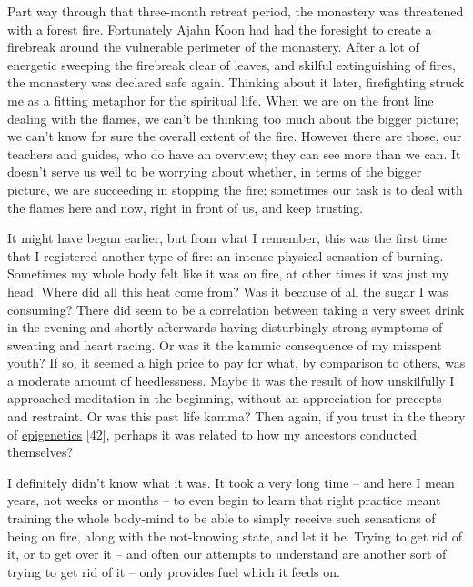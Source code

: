Part way through that three-month retreat period, the monastery was
threatened with a forest fire. Fortunately Ajahn Koon had had the
foresight to create a firebreak around the vulnerable perimeter of the
monastery. After a lot of energetic sweeping the firebreak clear of
leaves, and skilful extinguishing of fires, the monastery was declared
safe again. Thinking about it later, firefighting struck me as a fitting
metaphor for the spiritual life. When we are on the front line dealing
with the flames, we can't be thinking too much about the bigger picture;
we can't know for sure the overall extent of the fire. However there are
those, our teachers and guides, who do have an overview; they can see
more than we can. It doesn't serve us well to be worrying about whether,
in terms of the bigger picture, we are succeeding in stopping the fire;
sometimes our task is to deal with the flames here and now, right in
front of us, and keep trusting.

It might have begun earlier, but from what I remember, this was the
first time that I registered another type of fire: an intense physical
sensation of burning. Sometimes my whole body felt like it was on fire,
at other times it was just my head. Where did all this heat come from?
Was it because of all the sugar I was consuming? There did seem to be a
correlation between taking a very sweet drink in the evening and shortly
afterwards having disturbingly strong symptoms of sweating and heart
racing. Or was it the kammic consequence of my misspent youth? If so, it
seemed a high price to pay for what, by comparison to others, was a
moderate amount of heedlessness. Maybe it was the result of how
unskilfully I approached meditation in the beginning, without an
appreciation for precepts and restraint. Or was this past life kamma?
Then again, if you trust in the theory of
\href{https://en.wikipedia.org/wiki/Epigenetics}{\underline{epigenetics}}
{[}42{]}, perhaps it was related to how my ancestors conducted
themselves?

I definitely didn't know what it was. It took a very long time -- and
here I mean years, not weeks or months -- to even begin to learn that
right practice meant training the whole body-mind to be able to simply
receive such sensations of being on fire, along with the not-knowing
state, and let it be. Trying to get rid of it, or to get over it -- and
often our attempts to understand are another sort of trying to get rid
of it -- only provides fuel which it feeds on.

